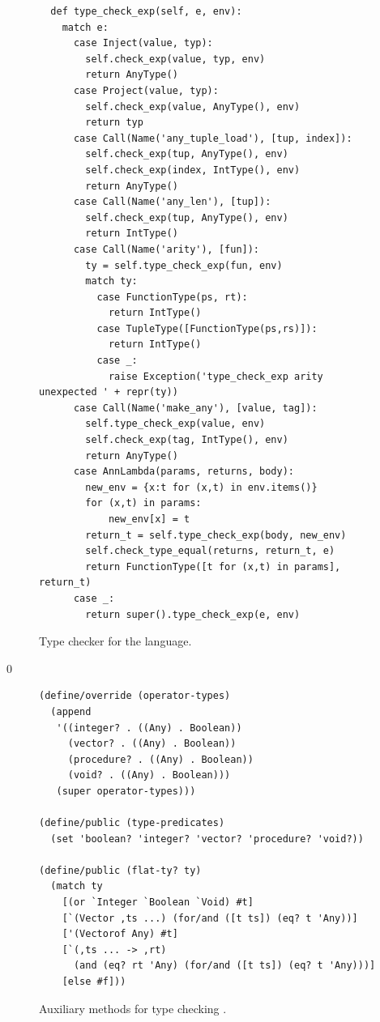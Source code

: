 \documentclass[7x10]{TimesAPriori_MIT}%
\def\racketEd{0}
\def\edition{0}
\numberwithin{theorem}{chapter}
\numberwithin{definition}{chapter}
\numberwithin{equation}{chapter}
\begin{document}
\begin{figure}[btp]
\begin{tcolorbox}[colback=white]
{\begin{lstlisting}
  def type_check_exp(self, e, env):
    match e:
      case Inject(value, typ):
        self.check_exp(value, typ, env)
        return AnyType()
      case Project(value, typ):
        self.check_exp(value, AnyType(), env)
        return typ
      case Call(Name('any_tuple_load'), [tup, index]):
        self.check_exp(tup, AnyType(), env)
        self.check_exp(index, IntType(), env)
        return AnyType()
      case Call(Name('any_len'), [tup]):
        self.check_exp(tup, AnyType(), env)
        return IntType()
      case Call(Name('arity'), [fun]):
        ty = self.type_check_exp(fun, env)
        match ty:
          case FunctionType(ps, rt):
            return IntType()
          case TupleType([FunctionType(ps,rs)]):
            return IntType()
          case _:
            raise Exception('type_check_exp arity unexpected ' + repr(ty))
      case Call(Name('make_any'), [value, tag]):
        self.type_check_exp(value, env)
        self.check_exp(tag, IntType(), env)
        return AnyType()
      case AnnLambda(params, returns, body):
        new_env = {x:t for (x,t) in env.items()}
        for (x,t) in params:
            new_env[x] = t
        return_t = self.type_check_exp(body, new_env)
        self.check_type_equal(returns, return_t, e)
        return FunctionType([t for (x,t) in params], return_t)
      case _:
        return super().type_check_exp(e, env)
\end{lstlisting}
\fi}
  \end{tcolorbox}

  \caption{Type checker for the \LangAny{} language.}
\label{fig:type-check-Lany}
\end{figure}

{\if\edition\racketEd
\begin{figure}[tbp]
  \begin{tcolorbox}[colback=white]
\begin{lstlisting}
(define/override (operator-types)
  (append
   '((integer? . ((Any) . Boolean))
     (vector? . ((Any) . Boolean))
     (procedure? . ((Any) . Boolean))
     (void? . ((Any) . Boolean)))
   (super operator-types)))

(define/public (type-predicates)
  (set 'boolean? 'integer? 'vector? 'procedure? 'void?))

(define/public (flat-ty? ty)
  (match ty
    [(or `Integer `Boolean `Void) #t]
    [`(Vector ,ts ...) (for/and ([t ts]) (eq? t 'Any))]
    ['(Vectorof Any) #t]
    [`(,ts ... -> ,rt)
      (and (eq? rt 'Any) (for/and ([t ts]) (eq? t 'Any)))]
    [else #f]))
\end{lstlisting}
\end{tcolorbox}

\caption{Auxiliary methods for type checking \LangAny{}.}
\label{fig:type-check-Lany-aux}
\end{figure}
\fi}
\end{document}
